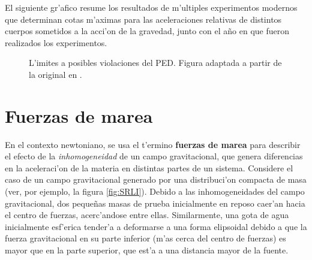 El siguiente gr'afico resume los resultados de m'ultiples experimentos modernos que determinan cotas m'aximas para las aceleraciones relativas de distintos cuerpos sometidos a la acci'on de la gravedad, junto con el a\~no en que fueron realizados los experimentos.
\begin{center}
\begin{figure}[H]
\centerline{}
\caption{L'imites a posibles violaciones del PED. Figura adaptada a partir de la original en \cite{Turyshev08}.}
\label{fig:equiv1}
\end{figure}
\end{center}

\section{Fuerzas de marea}
En el contexto newtoniano, se usa el t'ermino \textbf{fuerzas de marea} para describir el efecto de la \textit{inhomogeneidad} de un campo gravitacional, que genera diferencias en la aceleraci'on de la materia en distintas partes de un sistema. Considere el caso de un campo gravitacional generado por una distribuci'on compacta de masa (ver, por ejemplo, la figura \ref{fig:SRLI}). Debido a las inhomogeneidades del campo gravitacional, dos peque\~nas masas de prueba inicialmente en reposo caer'an hacia el centro de fuerzas, acerc'andose entre ellas. Similarmente, una gota de agua inicialmente esf'erica tender'a a deformarse a una forma elipsoidal debido a que la fuerza gravitacional en su parte inferior (m'as cerca del centro de fuerzas) es mayor que en la parte superior, que est'a a una distancia mayor de la fuente.

